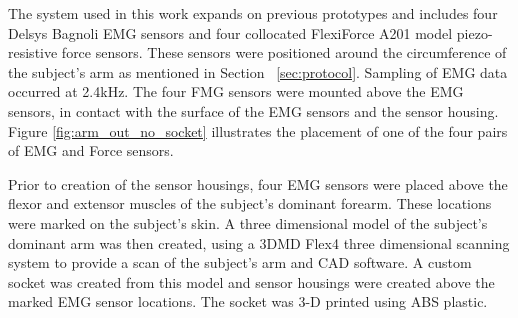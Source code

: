 \documentclass[twocolumn]{sagej}
\begin{document}
\begin{comment}
\begin{figure}[htbp]
\centering
\subfigure[]{\epsfig{figure=2sensor_socket.png,width=1.52in}\label{fig:twosensorsocket_worbla}}
\subfigure[]{\epsfig{figure=C:/Users/Joe/Dropbox/Grad_School/Resesarch/My_Papers/EMG-FMG-Journal_Article/Figures/two_sensor_socket_rear_view.png,width=1.7in}\label{fig:twosensorsocket_CAD}}
\caption{a)Second iteration of healthy limb socket (rear view). Sensor housing seen in white. b) Rapid Prototyped, printed, socket in ABS Plastic }
\end{figure}
\end{comment}
The system used in this work expands on previous prototypes and includes four Delsys Bagnoli EMG sensors and four collocated FlexiForce A201 model piezo-resistive force sensors.  These sensors were positioned around the circumference of the subject's arm as mentioned in Section ~\ref{sec:protocol}.  Sampling of EMG data occurred at 2.4kHz.  The four FMG sensors were mounted above the EMG sensors, in contact with the surface of the EMG sensors and the sensor housing.  Figure \ref{fig:arm_out_no_socket} illustrates the placement of one of the four pairs of EMG and Force sensors.\par \noindent
Prior to creation of the sensor housings, four EMG sensors were placed above the flexor and extensor muscles of the subject's dominant forearm.  These locations were marked on the subject's skin.  A three dimensional model of the subject's dominant arm was then created, using a 3DMD Flex4 \cite{3dMD} three dimensional scanning system to provide a scan of the subject's arm and CAD software.  A custom socket was created from this model and sensor housings were created above the marked EMG sensor locations.  The socket was 3-D printed using ABS plastic.  \par \noindent%
\begin{comment}
\begin{figure}[htbp]
\centering
\subfigure[]{\epsfig{figure=arm_out_no_socket_crop_BW.png,width=2.5in}
\label{fig:arm_out_no_socket}}
\subfigure[]{\epsfig{figure=arm_socket_BW.png,width=2.5in}
 \label{fig:arm_socket}}
 \caption{a) Subject wearing SEMG and FMG collocated sensors b) Subject wearing simulated prosthetic socket and sensors}

\end{figure}
\end{comment}
\end{document}
